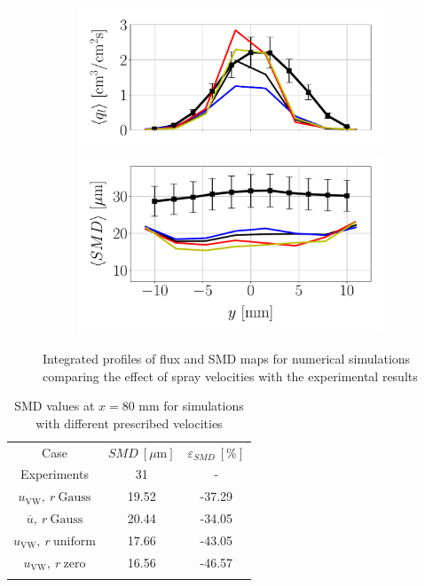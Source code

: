 \begin{figure}[ht]
\begin{subfigure}[b]{0.4\textwidth}
	\flushleft
   \includegraphics[scale=0.35]{./part2_developments/figures_ch6_lagrangian_JICF/params_spray_velocities/profiles/flux_along_y}\\
   \vspace{-0.16in}
   \includegraphics[scale=0.35]{./part2_developments/figures_ch6_lagrangian_JICF/params_spray_velocities/profiles/SMD_along_y}
\end{subfigure}

\caption{Integrated profiles of flux and SMD maps for numerical simulations comparing the effect of spray velocities with the experimental results}
\label{fig:profiles_LGS_JICF_spray_velocities}
\end{figure}

\begin{table}[!h]
\centering
\caption{SMD values at $x = 80$ mm for simulations with different prescribed velocities}
\begin{tabular}{ccc}
\thickhline
Case & $SMD~\left[\mu \mathrm{m} \right]$ & $\varepsilon_{SMD}~\left[\% \right]$ \\
\thickhline
Experiments & 31 & - \\
$u_\mathrm{VW},~r~\mathrm{Gauss}$ & 19.52 & -37.29 \\
$\overline{u},~r~\mathrm{Gauss}$ & 20.44 & -34.05 \\
$u_\mathrm{VW},~r~\mathrm{uniform}$ & 17.66 & -43.05 \\
$u_\mathrm{VW},~r~\mathrm{zero}$ & 16.56 & -46.57 \\
\thickhline
\end{tabular}
\label{tab:SMD_deviations_spray_velocities}
\end{table}


